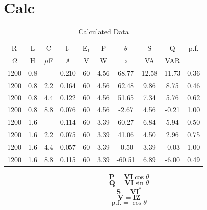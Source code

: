 \documentclass{article}
\begin{document}
\section{Calc}
\begin{table}[h]
  \begin{center}
    \begin{tabular}{cccccccccc}
      \hline
      R & L & C & I$_1$ & E$_1$ & P & $\theta$ & S & Q & p.f. \\
      $\Omega$ & H & $\mu$F & A & V & W & $\circ$ & VA & VAR & \\
      \hline
      1200 & 0.8 & --- & 0.210 & 60 & 4.56 &  68.77 & 12.58 & 11.73 & 0.36 \\
      1200 & 0.8 & 2.2 & 0.164 & 60 & 4.56 &  62.48 &  9.86 &  8.75 & 0.46 \\
      1200 & 0.8 & 4.4 & 0.122 & 60 & 4.56 &  51.65 &  7.34 &  5.76 & 0.62 \\
      1200 & 0.8 & 8.8 & 0.076 & 60 & 4.56 &  -2.67 &  4.56 & -0.21 & 1.00 \\
      1200 & 1.6 & --- & 0.114 & 60 & 3.39 &  60.27 &  6.84 &  5.94 & 0.50 \\
      1200 & 1.6 & 2.2 & 0.075 & 60 & 3.39 &  41.06 &  4.50 &  2.96 & 0.75 \\
      1200 & 1.6 & 4.4 & 0.057 & 60 & 3.39 &  -0.50 &  3.39 & -0.03 & 1.00 \\
      1200 & 1.6 & 8.8 & 0.115 & 60 & 3.39 & -60.51 &  6.89 & -6.00 & 0.49 \\
      \hline
    \end{tabular}
    \caption{Calculated Data}
    \label{calc_dat}
  \end{center}
\end{table}

\[\mathbf{P} = \mathbf{VI}\cos\theta \]
\[\mathbf{Q} = \mathbf{VI}\sin\theta\]
\[\mathbf{S} = \mathbf{VI}^*\]
\[\mathbf{V} = \mathbf{IZ}\]
\[\text{p.f.} = \cos\theta\]
\end{document}
